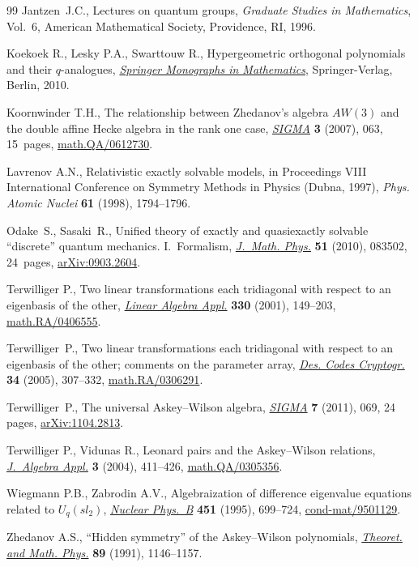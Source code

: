\documentclass[pdftex]{sigma}
\numberwithin{equation}{section}
\begin{document}
\begin{thebibliography}{99}
Jantzen~J.C.,
Lectures on quantum groups,
{\it Graduate Studies in Mathematics}, Vol.~6,
American Mathema\-ti\-cal Society, Providence, RI, 1996.

Koekoek R., Lesky P.A., Swarttouw R.,
Hypergeometric orthogonal polynomials and their $q$-analogues,
\href{http://dx.doi.org/10.1007/978-3-642-05014-5}{{\it  Springer Monographs in Mathematics}}, Springer-Verlag, Berlin, 2010.

Koornwinder T.H.,
 The relationship between Zhedanov's algebra $AW(3)$ and the double af\/f\/ine Hecke algebra in the rank one case,
\href{http://dx.doi.org/10.3842/SIGMA.2007.063}{{\it SIGMA}} {\bf 3}  (2007), 063, 15~pages,
\href{http://arxiv.org/abs/math.QA/0612730}{math.QA/0612730}.

Lavrenov A.N.,
Relativistic exactly solvable models,
in Proceedings VIII International Conference on Symmetry Methods in Physics (Dubna, 1997),
{\it Phys. Atomic Nuclei} {\bf 61} (1998), 1794--1796.


Odake~S., Sasaki~R.,
Unif\/ied theory of exactly and quasiexactly solvable ``discrete'' quantum mechanics. I.~Formalism,
\href{http://dx.doi.org/10.1063/1.3458866}{{\em J.~Math. Phys.}} {\bf 51} (2010), 083502, 24~pages,
\href{http://arxiv.org/abs/0903.2604}{arXiv:0903.2604}.


Terwilliger P.,
Two linear transformations each tridiagonal with respect to an eigenbasis of the other,
\href{http://dx.doi.org/10.1016/S0024-3795(01)00242-7}{{\it Linear Algebra Appl.}}  {\bf 330} (2001), 149--203,
\href{http://arxiv.org/abs/math.RA/0406555}{math.RA/0406555}.

Terwilliger~P.,
Two linear transformations each tridiagonal with respect to an eigenbasis of the other; comments on the parameter array,
\href{http://dx.doi.org/10.1007/s10623-004-4862-7}{{\em Des. Codes Cryptogr.}}  {\bf 34}  (2005), 307--332,
\href{http://arxiv.org/abs/math.RA/0306291}{math.RA/0306291}.

Terwilliger~P.,
The universal Askey--Wilson algebra,
\href{http://dx.doi.org/10.3842/SIGMA.2011.069}{{\em SIGMA}} {\bf 7} (2011), 069, 24 pages,
\href{http://arxiv.org/abs/1104.2813}{arXiv:1104.2813}.

Terwilliger P., Vidunas R.,
Leonard pairs and the Askey--Wilson relations,
\href{http://dx.doi.org/10.1142/S0219498804000940}{{\it J.~Algebra Appl.}} {\bf 3} (2004), 411--426,
\href{http://arxiv.org/abs/math.QA/0305356}{math.QA/0305356}.


Wiegmann P.B.,  Zabrodin A.V.,
Algebraization of dif\/ference eigenvalue equations related to $U_q(sl_2)$,
\href{http://dx.doi.org/10.1016/0550-3213(95)00361-U}{{\it Nuclear Phys.~B}} {\bf 451} (1995), 699--724,
\href{http://arxiv.org/abs/cond-mat/9501129}{cond-mat/9501129}.


Zhedanov A.S.,
``Hidden symmetry'' of the Askey--Wilson polynomials,
\href{http://dx.doi.org/10.1007/BF01015906}{{\it Theoret. and Math. Phys.}} {\bf 89} (1991), 1146--1157.

\end{thebibliography}\LastPageEnding
\end{document}
